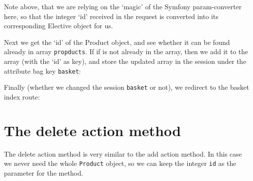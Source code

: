 \documentclass[a4paperpaper,openright]{book}
\newenvironment{Shaded}{}{}
\newcommand{\CommentTok}[1]{\textcolor[rgb]{0.38,0.63,0.69}{\textit{#1}}}
\newcommand{\FunctionTok}[1]{\textcolor[rgb]{0.02,0.16,0.49}{#1}}
\newcommand{\KeywordTok}[1]{\textcolor[rgb]{0.00,0.44,0.13}{\textbf{#1}}}
\newcommand{\NormalTok}[1]{#1}
\newcommand{\OtherTok}[1]{\textcolor[rgb]{0.00,0.44,0.13}{#1}}
\newcommand{\StringTok}[1]{\textcolor[rgb]{0.25,0.44,0.63}{#1}}
\begin{document}
Note above, that we are relying on the `magic' of the Symfony
param-converter here, so that the integer `id' received in the request
is converted into its corresponding Elective object for us.

Next we get the `id' of the Product object, and see whether it can be
found already in array \texttt{propducts}. If if is not already in the
array, then we add it to the array (with the `id' as key), and store the
updated array in the session under the attribute bag key
\texttt{basket}:

\begin{Shaded}
\end{Shaded}

Finally (whether we changed the session \texttt{basket} or not), we
redirect to the basket index route:

\begin{Shaded}
\end{Shaded}

\hypertarget{the-delete-action-method}{%
\section{The delete action method}\label{the-delete-action-method}}

The delete action method is very similar to the add action method. In
this case we never need the whole \texttt{Product} object, so we can
keep the integer \texttt{id} as the parameter for the method.
\end{document}
